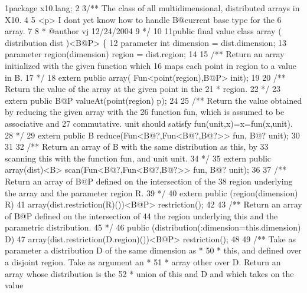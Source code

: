 \begin{tightcode}
\quad\num{1}package x10.lang;
\quad\num{2}
\quad\num{3}/** The class of all  multidimensional, distributed arrays in X10.
\quad\num{4}
\quad\num{5}    <p> I dont yet know how to handle B@current base type for the
\quad\num{6}    array.
\quad\num{7}
\quad\num{8} * @author vj 12/24/2004
\quad\num{9} */
\quad\num{10}
\quad\num{11}public final value class array ( distribution dist )<B@P> \{
\quad\num{12}    parameter int dimension = dist.dimension;
\quad\num{13}    parameter region(dimension) region = dist.region;
\quad\num{14}
\quad\num{15}    /** Return an array initialized with the given function which
\quad\num{16}        maps each point in region to a value in B.
\quad\num{17}     */
\quad\num{18}    extern public array( Fun<point(region),B@P> init);
\quad\num{19}
\quad\num{20}    /** Return the value of the array at the given point in the
\quad\num{21}     * region.
\quad\num{22}     */
\quad\num{23}    extern public B@P valueAt(point(region) p);
\quad\num{24}
\quad\num{25}    /** Return the value obtained by reducing the given array with the
\quad\num{26}        function fun, which is assumed to be associative and
\quad\num{27}        commutative. unit should satisfy fun(unit,x)=x=fun(x,unit).
\quad\num{28}     */
\quad\num{29}    extern public B reduce(Fun<B@?,Fun<B@?,B@?>> fun, B@? unit);
\quad\num{30}
\quad\num{31}
\quad\num{32}    /** Return an array of B with the same distribution as this, by
\quad\num{33}        scanning this with the function fun, and unit unit.
\quad\num{34}     */
\quad\num{35}    extern public array(dist)<B> scan(Fun<B@?,Fun<B@?,B@?>> fun, B@? unit);
\quad\num{36}
\quad\num{37}    /** Return an array of B@P defined on the intersection of the
\quad\num{38}        region underlying the array and the parameter region R.
\quad\num{39}     */
\quad\num{40}    extern public (region(dimension) R)
\quad\num{41}        array(dist.restriction(R)())<B@P>  restriction();
\quad\num{42}
\quad\num{43}    /** Return an array of B@P defined on the intersection of
\quad\num{44}        the region underlying this and the parametric distribution.
\quad\num{45}     */
\quad\num{46}    public  (distribution(:dimension=this.dimension) D)
\quad\num{47}        array(dist.restriction(D.region)())<B@P> restriction();
\quad\num{48}
\quad\num{49}    /** Take as parameter a distribution D of the same dimension as *
\quad\num{50}     * this, and defined over a disjoint region. Take as argument an *
\quad\num{51}     * array other over D. Return an array whose distribution is the
\quad\num{52}     * union of this and D and which takes on the value

\end{tightcode}
